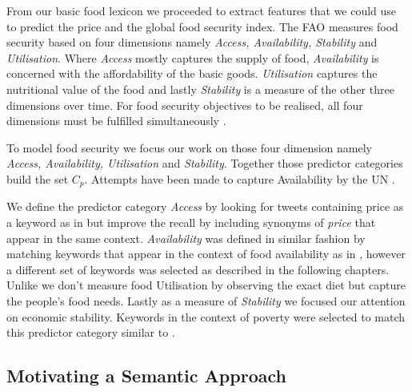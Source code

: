 \documentclass[12pt]{report}
\begin{document}
From our basic food lexicon we proceeded to extract features that we could use to predict the price and the global food security index. The FAO measures food security based on four dimensions namely \emph{Access, Availability, Stability} and \emph{Utilisation}. Where \emph{Access} mostly captures the supply of food, \emph{Availability} is concerned with the affordability of the basic goods. \emph{Utilisation} captures the nutritional value of the food and lastly \emph{Stability} is a measure of the other three dimensions over time. For food security objectives to be realised, all four dimensions must be fulfilled simultaneously \cite{fao2008}. 


To model food security we focus our work on those four dimension namely \emph{Access, Availability, Utilisation} and \emph{Stability}. Together those predictor categories build the set $C_p$. Attempts have been made to capture Availability by the UN \cite{ungp2013}. 

We define the predictor category \emph{Access} by looking for tweets containing price as a keyword as in \cite{ungp2013} but improve the recall by including synonyms of \emph{price} that appear in the same context. \emph{Availability} was defined in similar fashion by matching keywords that appear in the context of food availability as in \cite{hum14}, however a different set of keywords was selected as described in the following chapters. Unlike \cite{AbbarMW14} we don't measure food Utilisation by observing the exact diet but capture the people's food needs. Lastly as a measure of \emph{Stability} we focused our attention on economic stability. Keywords in the context of  poverty were selected to match this predictor category similar to \cite{RePEc} \cite{hum14}.

\subsection{Motivating a Semantic Approach}
\label{subsec:hal}
\end{document}
